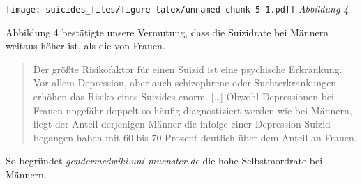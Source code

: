 \documentclass[]{article}
\newenvironment{Shaded}{\begin{snugshade}}{\end{snugshade}}
\newcommand{\DataTypeTok}[1]{\textcolor[rgb]{0.13,0.29,0.53}{#1}}
\newcommand{\DecValTok}[1]{\textcolor[rgb]{0.00,0.00,0.81}{#1}}
\newcommand{\KeywordTok}[1]{\textcolor[rgb]{0.13,0.29,0.53}{\textbf{#1}}}
\newcommand{\NormalTok}[1]{#1}
\newcommand{\OperatorTok}[1]{\textcolor[rgb]{0.81,0.36,0.00}{\textbf{#1}}}
\newcommand{\StringTok}[1]{\textcolor[rgb]{0.31,0.60,0.02}{#1}}
\begin{document}
\texttt{[image: suicides\_files/figure-latex/unnamed-chunk-5-1.pdf]}
\emph{Abbildung 4}

Abbildung 4 bestätigte unsere Vermutung, dass die Suizidrate bei Männern
weitaus höher ist, als die von Frauen.

\begin{quote}
Der größte Risikofaktor für einen Suizid ist eine psychische Erkrankung.
Vor allem Depression, aber auch schizophrene oder Suchterkrankungen
erhöhen das Risiko eines Suizides enorm. {[}\ldots{}{]} Obwohl
Depressionen bei Frauen ungefähr doppelt so häufig diagnostiziert werden
wie bei Männern, liegt der Anteil derjenigen Männer die infolge einer
Depression Suizid begangen haben mit 60 bis 70 Prozent deutlich über dem
Anteil an Frauen.
\end{quote}

So begründet \emph{gendermedwiki.uni-muenster.de} die hohe
Selbstmordrate bei Männern.

\begin{Shaded}
\end{Shaded}
\end{document}
